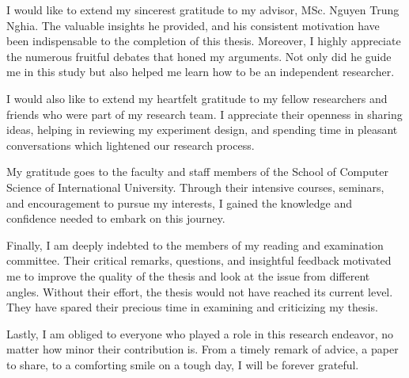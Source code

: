 
I would like to extend my sincerest gratitude to my advisor, MSc. Nguyen Trung Nghia. The valuable insights he provided, and his consistent motivation have been indispensable to the completion of this thesis. Moreover, I highly appreciate the numerous fruitful debates that honed my arguments. Not only did he guide me in this study but also helped me learn how to be an independent researcher.

I would also like to extend my heartfelt gratitude to my fellow researchers and friends who were part of my research team. I appreciate their openness in sharing ideas, helping in reviewing my experiment design, and spending time in pleasant conversations which lightened our research process.

My gratitude goes to the faculty and staff members of the School of Computer Science of International University. Through their intensive courses, seminars, and encouragement to pursue my interests, I gained the knowledge and confidence needed to embark on this journey.

Finally, I am deeply indebted to the members of my reading and examination committee. Their critical remarks, questions, and insightful feedback motivated me to improve the quality of the thesis and look at the issue from different angles. Without their effort, the thesis would not have reached its current level. They have spared their precious time in examining and criticizing my thesis.

Lastly, I am obliged to everyone who played a role in this research endeavor, no matter how minor their contribution is. From a timely remark of advice, a paper to share, to a comforting smile on a tough day, I will be forever grateful.
